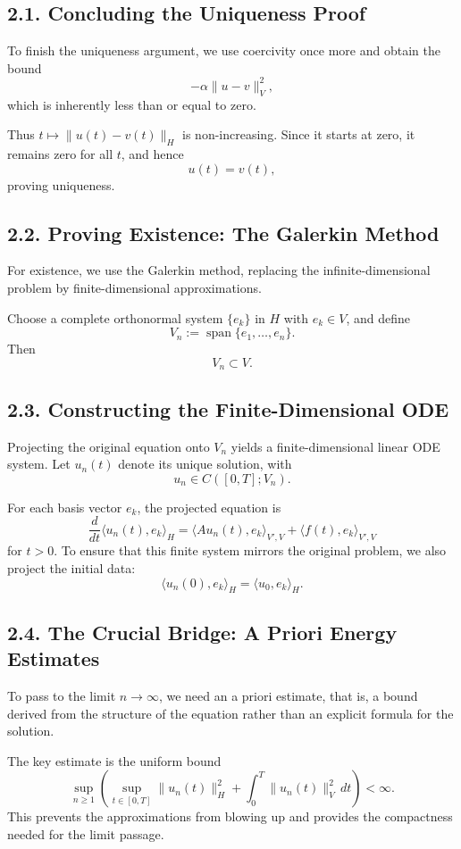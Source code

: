 \documentclass[11pt]{article}
\theoremstyle{definition}
\theoremstyle{remark}
\begin{document}
\subsection*{2.1. Concluding the Uniqueness Proof}
To finish the uniqueness argument, we use coercivity once more and obtain the bound
\[
-\alpha\|u-v\|_V^2,
\]
which is inherently less than or equal to zero.

Thus \(t\mapsto \|u(t)-v(t)\|_H\) is non-increasing. Since it starts at zero, it remains zero for all \(t\), and hence
\[
u(t)=v(t),
\]
proving uniqueness.

\subsection*{2.2. Proving Existence: The Galerkin Method}
For existence, we use the Galerkin method, replacing the infinite-dimensional problem by finite-dimensional approximations.

Choose a complete orthonormal system \(\{e_k\}\) in \(H\) with \(e_k\in V\), and define
\[
V_n:=\operatorname{span}\{e_1,\dots,e_n\}.
\]
Then
\[
V_n\subset V.
\]

\subsection*{2.3. Constructing the Finite-Dimensional ODE}
Projecting the original equation onto \(V_n\) yields a finite-dimensional linear ODE system. Let \(u_n(t)\) denote its unique solution, with
\[
u_n\in C([0,T];V_n).
\]

For each basis vector \(e_k\), the projected equation is
\[
\frac{d}{dt}\langle u_n(t),e_k\rangle_H
=
\langle Au_n(t),e_k\rangle_{V',V}
+
\langle f(t),e_k\rangle_{V',V}
\]
for \(t>0\). To ensure that this finite system mirrors the original problem, we also project the initial data:
\[
\langle u_n(0),e_k\rangle_H=\langle u_0,e_k\rangle_H.
\]

\subsection*{2.4. The Crucial Bridge: A Priori Energy Estimates}
To pass to the limit \(n\to\infty\), we need an a priori estimate, that is, a bound derived from the structure of the equation rather than an explicit formula for the solution.

The key estimate is the uniform bound
\[
\sup_{n\ge 1}
\left(
\sup_{t\in[0,T]}\|u_n(t)\|_H^2
+
\int_0^T \|u_n(t)\|_V^2\,dt
\right)
<\infty.
\]
This prevents the approximations from blowing up and provides the compactness needed for the limit passage.
\end{document}
